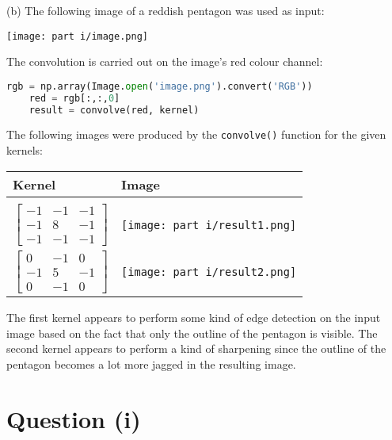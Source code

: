 \documentclass[12pt]{article}
\begin{document}
\noindent (b) The following image of a reddish pentagon was used as input:

\begin{center}
    \texttt{[image: part i/image.png]}
\end{center}

The convolution is carried out on the image's red colour channel:

\begin{center}
    \lstset{basicstyle=\footnotesize}
    \begin{lstlisting}[language=Python]
    rgb = np.array(Image.open('image.png').convert('RGB'))
    red = rgb[:,:,0]
    result = convolve(red, kernel)
    \end{lstlisting}
\end{center}

The following images were produced by the \texttt{convolve()} function for the given kernels:

\begin{center}
    \begin{tabular}{>{\centering\arraybackslash}m{3.5cm}>{\centering\arraybackslash}m{3.5cm}}
         Kernel & Image \\
         \hline \\
         $\begin{bmatrix} -1 & -1 & -1 \\ -1 & 8 & -1 \\ -1 & -1 & -1 \end{bmatrix}$ & \texttt{[image: part i/result1.png]} \\
         $\begin{bmatrix} 0 & -1 & 0 \\ -1 & 5 & -1 \\ 0 & -1 & 0 \end{bmatrix}$ & \texttt{[image: part i/result2.png]} \\
    \end{tabular}
\end{center}

The first kernel appears to perform some kind of edge detection on the input image based on the fact that only the outline of the pentagon is visible. The second kernel appears to perform a kind of sharpening since the outline of the pentagon becomes a lot more jagged in the resulting image.

\section*{Question (i)}
\end{document}
